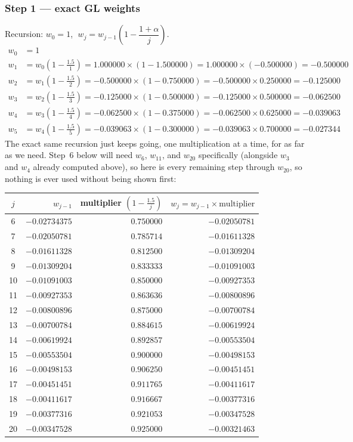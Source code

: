 \documentclass[11pt]{article}
\begin{document}
\subsubsection*{Step 1 --- exact GL weights}
Recursion: $w_0=1$, $\;w_j = w_{j-1}\left(1-\dfrac{1+\alpha}{j}\right)$.
\begin{align*}
w_0 &= 1 \\
w_1 &= w_0\left(1-\tfrac{1.5}{1}\right) = 1.000000 \times (1-1.500000) = 1.000000\times(-0.500000) = -0.500000 \\
w_2 &= w_1\left(1-\tfrac{1.5}{2}\right) = -0.500000 \times (1-0.750000) = -0.500000\times 0.250000 = -0.125000 \\
w_3 &= w_2\left(1-\tfrac{1.5}{3}\right) = -0.125000 \times (1-0.500000) = -0.125000\times 0.500000 = -0.062500 \\
w_4 &= w_3\left(1-\tfrac{1.5}{4}\right) = -0.062500 \times (1-0.375000) = -0.062500\times 0.625000 = -0.039063 \\
w_5 &= w_4\left(1-\tfrac{1.5}{5}\right) = -0.039063 \times (1-0.300000) = -0.039063\times 0.700000 = -0.027344
\end{align*}
The exact same recursion just keeps going, one multiplication at a time, for as far as we need. Step~6 below will need $w_6$, $w_{11}$, and $w_{20}$ specifically (alongside $w_3$ and $w_4$ already computed above), so here is every remaining step through $w_{20}$, so nothing is ever used without being shown first:
\begin{center}
\small
\begin{tabular}{c r r r}
\toprule
$j$ & $w_{j-1}$ & multiplier $\left(1-\tfrac{1.5}{j}\right)$ & $w_j = w_{j-1}\times\text{multiplier}$ \\
\midrule
6  & $-0.02734375$ & $0.750000$ & $-0.02050781$ \\
7  & $-0.02050781$ & $0.785714$ & $-0.01611328$ \\
8  & $-0.01611328$ & $0.812500$ & $-0.01309204$ \\
9  & $-0.01309204$ & $0.833333$ & $-0.01091003$ \\
10 & $-0.01091003$ & $0.850000$ & $-0.00927353$ \\
11 & $-0.00927353$ & $0.863636$ & $\mathbf{-0.00800896}$ \\
12 & $-0.00800896$ & $0.875000$ & $-0.00700784$ \\
13 & $-0.00700784$ & $0.884615$ & $-0.00619924$ \\
14 & $-0.00619924$ & $0.892857$ & $-0.00553504$ \\
15 & $-0.00553504$ & $0.900000$ & $-0.00498153$ \\
16 & $-0.00498153$ & $0.906250$ & $-0.00451451$ \\
17 & $-0.00451451$ & $0.911765$ & $-0.00411617$ \\
18 & $-0.00411617$ & $0.916667$ & $-0.00377316$ \\
19 & $-0.00377316$ & $0.921053$ & $-0.00347528$ \\
20 & $-0.00347528$ & $0.925000$ & $\mathbf{-0.00321463}$ \\
\bottomrule
\end{tabular}
\end{center}
\end{document}
